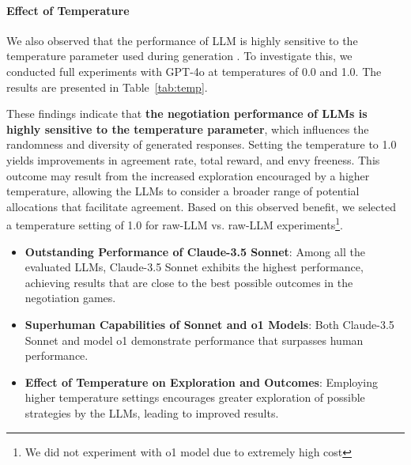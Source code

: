 \paragraph{Effect of Temperature}
We also observed that the performance of LLM is highly sensitive to the temperature parameter used during generation \cite{krishnamurthy2024can}. To investigate this, we conducted full experiments with GPT-4o at temperatures of 0.0 and 1.0. The results are presented in Table~\ref{tab:temp}.

\begin{table}[!ht]
    \centering
    \setlength{\tabcolsep}{8pt}
    \caption{GPT-4o with temperature 0.0 and 1.0}
    \label{tab:temp}
\end{table}

These findings indicate that \textbf{the negotiation performance of LLMs is highly sensitive to the temperature parameter}, which influences the randomness and diversity of generated responses. Setting the temperature to 1.0 yields improvements in agreement rate, total reward, and envy freeness. This outcome may result from the increased exploration encouraged by a higher temperature, allowing the LLMs to consider a broader range of potential allocations that facilitate agreement. Based on this observed benefit, we selected a temperature setting of 1.0 for raw-LLM vs. raw-LLM experiments\footnote{We did not experiment with o1 model due to extremely high cost}.

\begin{tcolorbox}[colback=gray!5,colframe=blue!40!black,title=\textbf{Summary: raw-LLM vs. raw-LLM Performance}] 
\begin{itemize} 
\item \textbf{Outstanding Performance of Claude-3.5 Sonnet}: Among all the evaluated LLMs, Claude-3.5 Sonnet exhibits the highest performance, achieving results that are close to the best possible outcomes in the negotiation games. 
\item \textbf{Superhuman Capabilities of Sonnet and o1 Models}: Both Claude-3.5 Sonnet and model o1 demonstrate performance that surpasses human performance.
\item \textbf{Effect of Temperature on Exploration and Outcomes}: Employing higher temperature settings encourages greater exploration of possible strategies by the LLMs, leading to improved results.
\end{itemize} 
\end{tcolorbox}

